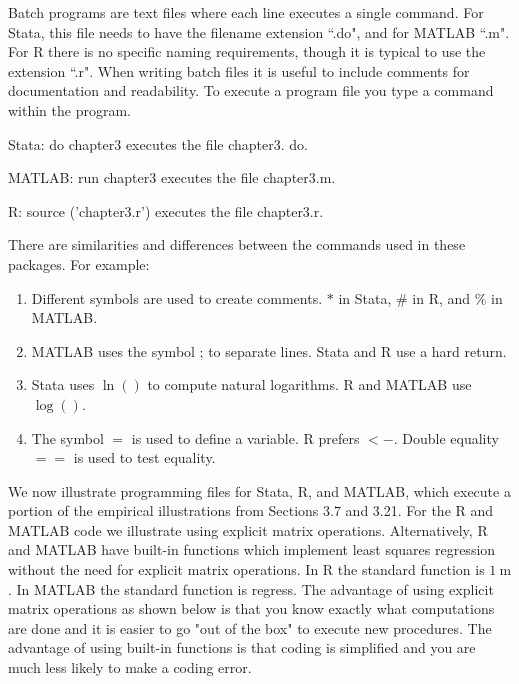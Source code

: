 \documentclass[10pt]{article}
\begin{document}
Batch programs are text files where each line executes a single command. For Stata, this file needs to have the filename extension “.do", and for MATLAB “.m". For R there is no specific naming requirements, though it is typical to use the extension “.r". When writing batch files it is useful to include comments for documentation and readability. To execute a program file you type a command within the program.

Stata: do chapter3 executes the file chapter3. do.

MATLAB: run chapter3 executes the file chapter3.m.

R: source ('chapter3.r') executes the file chapter3.r.

There are similarities and differences between the commands used in these packages. For example:

\begin{enumerate}
  \item Different symbols are used to create comments. $*$ in Stata, \# in $\mathrm{R}$, and $\%$ in MATLAB.

  \item MATLAB uses the symbol ; to separate lines. Stata and R use a hard return.

  \item Stata uses $\ln ()$ to compute natural logarithms. R and MATLAB use $\log ()$.

  \item The symbol $=$ is used to define a variable. $\mathrm{R}$ prefers $<-$. Double equality $==$ is used to test equality.

\end{enumerate}
We now illustrate programming files for Stata, R, and MATLAB, which execute a portion of the empirical illustrations from Sections $3.7$ and 3.21. For the R and MATLAB code we illustrate using explicit matrix operations. Alternatively, R and MATLAB have built-in functions which implement least squares regression without the need for explicit matrix operations. In $\mathrm{R}$ the standard function is $1 \mathrm{~m}$. In MATLAB the standard function is regress. The advantage of using explicit matrix operations as shown below is that you know exactly what computations are done and it is easier to go "out of the box" to execute new procedures. The advantage of using built-in functions is that coding is simplified and you are much less likely to make a coding error.
\end{document}
